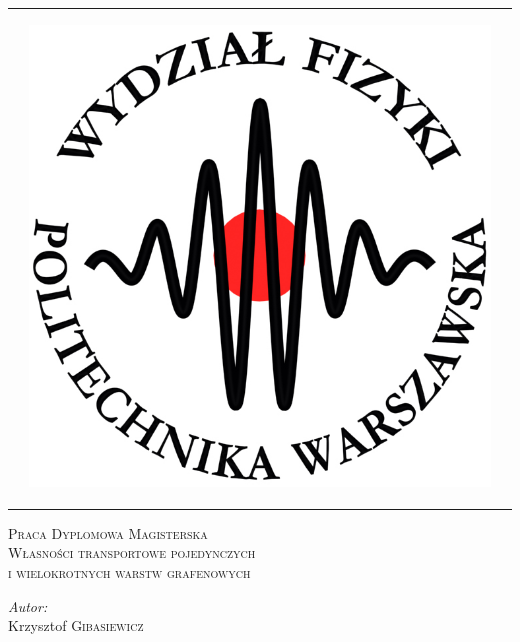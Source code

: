 \begin{titlepage}
\begin{flushleft}
\begin{tabular}{@{} c c c @{}}
		& \begin{minipage}{0.18\textwidth}\begin{center}  \includegraphics[width=\textwidth]{./Strona_tytulowa/obrazki/logofiz}\end{center}\end{minipage}
	\end{tabular}
\end{flushleft}
	
	\begin{center}
		\vspace{0.1\textheight}
		\textsc{\LARGE Praca Dyplomowa Magisterska}\\[0.05\textheight]
		\textsc{\Large Własności transportowe pojedynczych \\ i wielokrotnych warstw grafenowych}
		\vspace{0.4\textheight}
	\end{center}

	\begin{flushright}
		\begin{minipage}{0.4\textwidth}
		\begin{flushright}
		\emph{Autor:}\\
		Krzysztof \textsc{Gibasiewicz}
		\end{flushright}
		\end{minipage}
	\end{flushright}


\end{titlepage}
